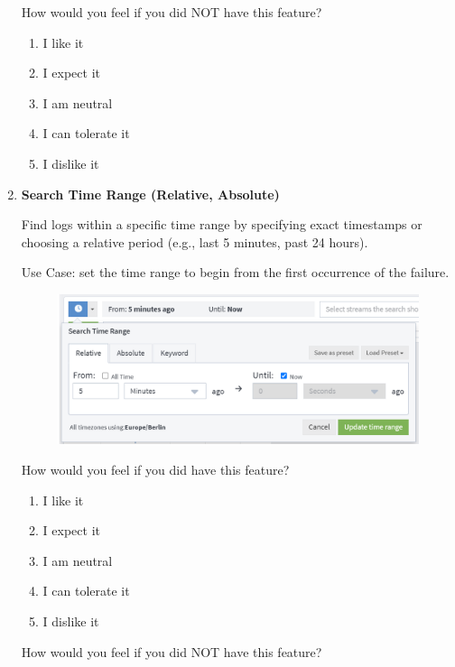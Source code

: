 \documentclass[../main.tex]{subfiles}
\begin{document}
\begin{enumerate}
    How would you feel if you did NOT have this feature?
    
    \begin{enumerate}
        \item I like it
        \item I expect it
        \item  I am neutral
        \item I can tolerate it
        \item I dislike it
    \end{enumerate}

    \clearpage
    \item \textbf{Search Time Range (Relative, Absolute)}
    
    Find logs within a specific time range by specifying exact timestamps or choosing a relative period (e.g., last 5 minutes, past 24 hours). 
    
    Use Case: set the time range to begin from the first occurrence of the failure.

    \begin{figure}[H]
        \centering
        \includegraphics[scale=0.8]{img/10-appendix/timerange_relative.png}
        \label{fig:timerange_relative}
    \end{figure}

    How would you feel if you did have this feature?
    
    \begin{enumerate}
        \item I like it
        \item I expect it
        \item  I am neutral
        \item I can tolerate it
        \item I dislike it
    \end{enumerate}

    How would you feel if you did NOT have this feature?
    

\end{enumerate}
\end{document}
